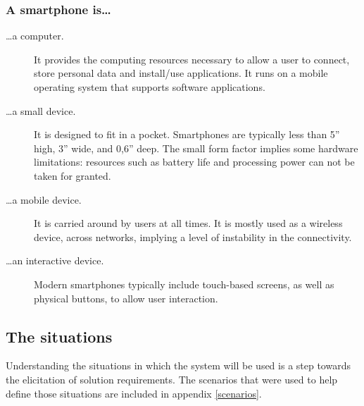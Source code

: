 \subsubsection{A smartphone is\ldots}

\begin{description}

\item[\ldots a computer.] 
It provides the computing resources necessary to allow a user to connect, store personal data and install/use applications.
It runs on a mobile operating system that supports software applications.

\item[\ldots a small device.] 
It is designed to fit in a pocket.
Smartphones are typically less than 5'' high, 3'' wide, and 0,6'' deep.
The small form factor implies some hardware limitations: resources such as battery life and processing power can not be taken for granted.

\item[\ldots a mobile device.]
It is carried around by users at all times.
It is mostly used as a wireless device, across networks, implying a level of instability in the connectivity.

\item[\ldots an interactive device.]
Modern smartphones typically include touch-based screens, as well as physical buttons, to allow user interaction.

\end{description}

\subsection{The situations}
\label{sec:scenarios}

Understanding the situations in which the system will be used is a step towards the elicitation of solution requirements.
The scenarios that were used to help define those situations are included in appendix \ref{scenarios}.


